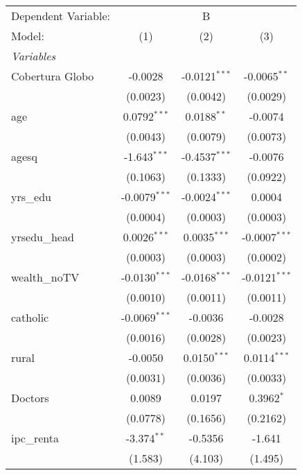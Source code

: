 \begingroup
\centering
\begin{tabular}{lccc}
   \tabularnewline \midrule \midrule
   Dependent Variable: & \multicolumn{3}{c}{B}\\
   Model:          & (1)             & (2)             & (3)\\  
   \midrule
   \emph{Variables}\\
   Cobertura Globo & -0.0028         & -0.0121$^{***}$ & -0.0065$^{**}$\\   
                   & (0.0023)        & (0.0042)        & (0.0029)\\   
   age             & 0.0792$^{***}$  & 0.0188$^{**}$   & -0.0074\\   
                   & (0.0043)        & (0.0079)        & (0.0073)\\   
   agesq           & -1.643$^{***}$  & -0.4537$^{***}$ & -0.0076\\   
                   & (0.1063)        & (0.1333)        & (0.0922)\\   
   yrs\_edu        & -0.0079$^{***}$ & -0.0024$^{***}$ & 0.0004\\   
                   & (0.0004)        & (0.0003)        & (0.0003)\\   
   yrsedu\_head    & 0.0026$^{***}$  & 0.0035$^{***}$  & -0.0007$^{***}$\\   
                   & (0.0003)        & (0.0003)        & (0.0002)\\   
   wealth\_noTV    & -0.0130$^{***}$ & -0.0168$^{***}$ & -0.0121$^{***}$\\   
                   & (0.0010)        & (0.0011)        & (0.0011)\\   
   catholic        & -0.0069$^{***}$ & -0.0036         & -0.0028\\   
                   & (0.0016)        & (0.0028)        & (0.0023)\\   
   rural           & -0.0050         & 0.0150$^{***}$  & 0.0114$^{***}$\\   
                   & (0.0031)        & (0.0036)        & (0.0033)\\   
   Doctors         & 0.0089          & 0.0197          & 0.3962$^{*}$\\   
                   & (0.0778)        & (0.1656)        & (0.2162)\\   
   ipc\_renta      & -3.374$^{**}$   & -0.5356         & -1.641\\   
                   & (1.583)         & (4.103)         & (1.495)\\   

\end{tabular}
